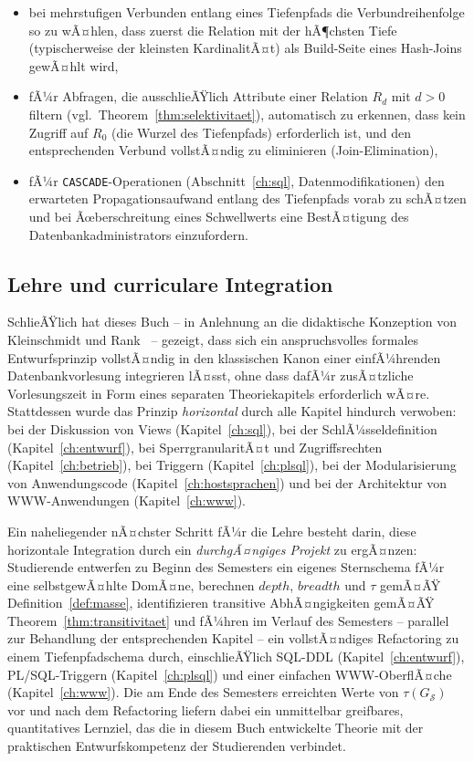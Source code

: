 ﻿\documentclass[a4paper,12pt]{report}
\theoremstyle{definition}
\theoremstyle{remark}
\newcommand{\depth}{\mathit{depth}}
\newcommand{\breadth}{\mathit{breadth}}
\begin{document}
\begin{itemize}
  \item bei mehrstufigen Verbunden entlang eines Tiefenpfads die
    Verbundreihenfolge so zu wÃ¤hlen, dass zuerst die Relation mit der
    hÃ¶chsten Tiefe (typischerweise der kleinsten KardinalitÃ¤t) als
    Build-Seite eines Hash-Joins gewÃ¤hlt wird,
  \item fÃ¼r Abfragen, die ausschlieÃŸlich Attribute einer Relation
    $R_d$ mit $d > 0$ filtern (vgl.\ Theorem~\ref{thm:selektivitaet}),
    automatisch zu erkennen, dass kein Zugriff auf $R_0$ (die Wurzel
    des Tiefenpfads) erforderlich ist, und den entsprechenden
    Verbund vollstÃ¤ndig zu eliminieren (Join-Elimination),
  \item fÃ¼r \texttt{CASCADE}-Operationen (Abschnitt~\ref{ch:sql},
    Datenmodifikationen) den erwarteten Propagationsaufwand entlang
    des Tiefenpfads vorab zu schÃ¤tzen und bei Ãœberschreitung eines
    Schwellwerts eine BestÃ¤tigung des Datenbankadministrators
    einzufordern.
\end{itemize}

\subsection{Lehre und curriculare Integration}
\label{sec:ausblick-lehre}

SchlieÃŸlich hat dieses Buch -- in Anlehnung an die didaktische
Konzeption von Kleinschmidt und Rank~\cite{Kleinschmidt2002} -- gezeigt,
dass sich ein anspruchsvolles formales Entwurfsprinzip vollstÃ¤ndig in
den klassischen Kanon einer einfÃ¼hrenden Datenbankvorlesung integrieren
lÃ¤sst, ohne dass dafÃ¼r zusÃ¤tzliche Vorlesungszeit in Form eines
separaten Theoriekapitels erforderlich wÃ¤re. Stattdessen wurde das
Prinzip \emph{horizontal} durch alle Kapitel hindurch verwoben: bei der
Diskussion von Views (Kapitel~\ref{ch:sql}), bei der
SchlÃ¼sseldefinition (Kapitel~\ref{ch:entwurf}), bei
SperrgranularitÃ¤t und Zugriffsrechten (Kapitel~\ref{ch:betrieb}), bei
Triggern (Kapitel~\ref{ch:plsql}), bei der Modularisierung von
Anwendungscode (Kapitel~\ref{ch:hostsprachen}) und bei der
Architektur von WWW-Anwendungen (Kapitel~\ref{ch:www}).

Ein naheliegender nÃ¤chster Schritt fÃ¼r die Lehre besteht darin, diese
horizontale Integration durch ein \emph{durchgÃ¤ngiges Projekt} zu
ergÃ¤nzen: Studierende entwerfen zu Beginn des Semesters ein eigenes
Sternschema fÃ¼r eine selbstgewÃ¤hlte DomÃ¤ne, berechnen
$\depth$, $\breadth$ und $\tau$ gemÃ¤ÃŸ Definition~\ref{def:masse},
identifizieren transitive AbhÃ¤ngigkeiten gemÃ¤ÃŸ
Theorem~\ref{thm:transitivitaet} und fÃ¼hren im Verlauf des Semesters --
parallel zur Behandlung der entsprechenden Kapitel -- ein vollstÃ¤ndiges
Refactoring zu einem Tiefenpfadschema durch, einschlieÃŸlich
SQL-DDL (Kapitel~\ref{ch:entwurf}), PL/SQL-Triggern
(Kapitel~\ref{ch:plsql}) und einer einfachen WWW-OberflÃ¤che
(Kapitel~\ref{ch:www}). Die am Ende des Semesters erreichten Werte von
$\tau(G_{\mathcal{S}})$ vor und nach dem Refactoring liefern dabei ein
unmittelbar greifbares, quantitatives Lernziel, das die in diesem Buch
entwickelte Theorie mit der praktischen Entwurfskompetenz der
Studierenden verbindet.
\end{document}
